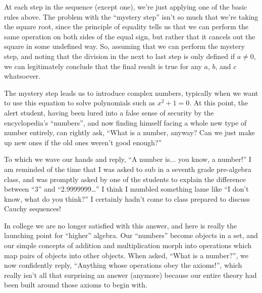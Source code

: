 At each step in the sequence (except one), we're just applying one of
the basic rules above.  The problem with the ``mystery step'' isn't so
much that we're taking the square root, since the principle of
equality tells us that we can perform the same operation on both sides
of the equal sign, but rather that it cancels out the square in some
undefined way.  So, assuming that we can perform the mystery step, and
noting that the division in the next to last step is only defined if
$a\ne0$, we can legitimately conclude that the final result is true
for any $a$, $b$, and $c$ whatsoever.

The mystery step leads us to introduce complex numbers,
typically when we want to use this equation to solve polynomials such
as $x^2+1=0$.  At this point, the alert student, having been lured into
a false sense of security by the encyclopedia's ``numbers'', and
now finding himself facing a whole new type of number entirely, can
rightly ask, ``What is a number, anyway?  Can we just make
up new ones if the old ones weren't good enough?''

To which we wave our hands and reply, ``A number is... you know, a number!''
I am reminded of the time that I was asked to sub in a
seventh grade pre-algebra class, and was promptly asked by one of the
students to explain the difference between ``3'' and ``2.9999999\ldots''
I think I mumbled something lame like ``I don't know, what do you
think?'' I certainly hadn't come to class prepared to discuss Cauchy
sequences!

In college we are no longer satisfied with this answer, and here is
really the launching point for ``higher'' algebra.  Our ``numbers''
become objects in a set, and our simple concepts of addition and
multiplication morph into operations which map pairs of objects into
other objects.  When asked, ``What is a number?'', we now confidently
reply, ``Anything whose operations obey the axioms!'', which really
isn't all that surprising an answer (anymore) because our entire
theory had been built around those axioms to begin with.


